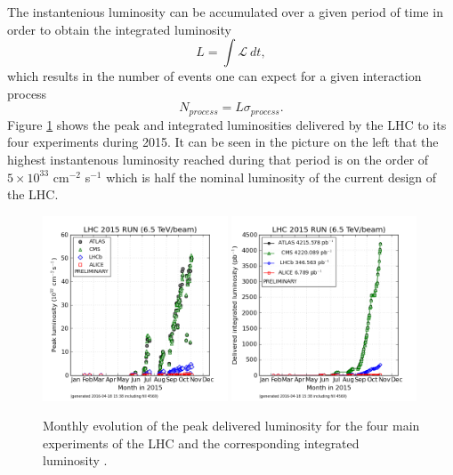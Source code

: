     The instantenious luminosity can be accumulated over a given period of time in order to obtain the integrated luminosity
  	\begin{equation}
  		L = \int \mathcal{L} \ dt ,
  	\end{equation}
  	which results in the number of events one can expect for a given interaction process
  	\begin{equation}
  		N_{process} = L \sigma_{process} .
  	\end{equation}
    Figure \ref{fig:I-2-luminosity} shows the peak and integrated luminosities delivered by the LHC to its four experiments during 2015. It can be seen in the picture on the left that the highest instantenous luminosity reached during that period is on the order of $ 5 \times 10^{33} $ cm$^{-2}$ s$^{-1}$ which is half the nominal luminosity of the current design of the LHC.

		\begin{figure}[h!]
			\centering
			\includegraphics[width=0.49\textwidth]{img/I-2-LHC/luminosity-peak.png}
			\includegraphics[width=0.49\textwidth]{img/I-2-LHC/luminosity-integrated.png}
			\caption{Monthly evolution of the peak delivered luminosity for the four main experiments of the LHC and the corresponding integrated luminosity \cite{LUMI-PP-LPC}.}
			\label{fig:I-2-luminosity}
		\end{figure}

